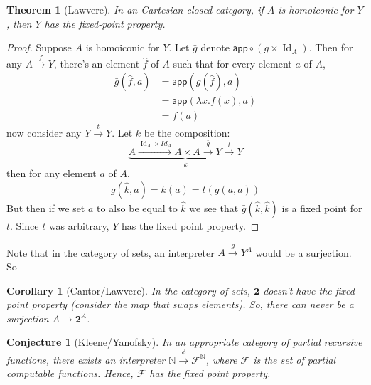 \documentclass{article}
\newtheorem{theorem}{Theorem}
\newtheorem{corrolary}{Corollary}
\newtheorem{conjecture}{Conjecture}
\DeclareMathOperator{\Id}{Id}
\begin{document}
\begin{theorem}[Lawvere] In an Cartesian closed category, if $A$ is homoiconic
  for $Y$, then $Y$ has the fixed-point property.
\end{theorem}
\begin{proof}
  Suppose $A$ is homoiconic for $Y$. Let $\bar{g}$ denote $\mathsf{app} \circ
  (g\times \Id_A)$. Then for any $A\xrightarrow{f}Y$, there's an element
  $\hat{f}$ of $A$ such that for every element $a$ of $A$, 
  \begin{align*}
    \bar{g}(\hat{f}, a) &= \mathsf{app}(g(\hat{f}),a) \\
                        &= \mathsf{app}(\lambda x. f(x),a)\\
                        &= f(a)
  \end{align*}
  now consider any $Y\xrightarrow{t}Y$. Let $k$ be the composition:
  $$\underbrace{A\xrightarrow{\Id_A\times Id_A} A\times A\xrightarrow{\bar{g}}Y\xrightarrow{t}Y}_k$$
  then for any element $a$ of $A$,
  $$\bar{g}(\hat{k}, a) = k(a) = t(\bar{g}(a,a))$$
  But then if we set $a$ to also be equal to $\hat{k}$ we see that $\bar{g}(\hat{k},\hat{k})$ is a fixed point for $t$. Since $t$ was arbitrary, $Y$ has the fixed point property.
\end{proof}

Note that in the category of sets, an interpreter $A\xrightarrow{g}Y^A$ would be
a surjection. So

\begin{corrolary}[Cantor/Lawvere] In the category of sets, $\mathbf{2}$ doesn't have the
  fixed-point property (consider the map that swaps elements). So, there can
  never be a surjection $A\rightarrow \mathbf{2}^A$.
\end{corrolary}

\begin{conjecture}[Kleene/Yanofsky] In an appropriate category of partial recursive functions, there
  exists an interpreter $\mathbb{N}\xrightarrow{\phi} \mathcal{F}^\mathbb{N}$,
  where $\mathcal{F}$ is the set of partial computable functions. Hence,
  $\mathcal{F}$ has the fixed point property.
\end{conjecture}
\end{document}

